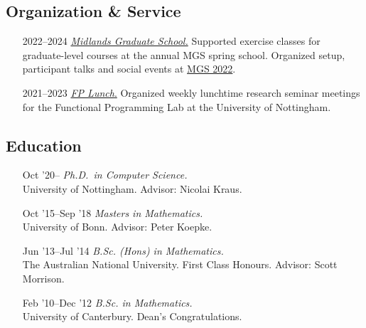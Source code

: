 \documentclass[12pt,a4paper]{article}
\begin{document}
\subsection{Organization \& Service}\label{organization-service}

\begin{itemize}[leftmargin=7ex]
\item[\small 2022--2024]
  \href{http://www.cs.nott.ac.uk/MGS}{\emph{Midlands Graduate School.}}
  Supported exercise classes for graduate-level courses at the annual MGS spring school.
  Organized setup, participant talks and social events at \href{https://www.cs.nott.ac.uk/~psznk/events/mgs22.html}{MGS 2022}.
\item[\small 2021--2023]
  \href{https://www.nottingham.ac.uk/research/groups/fp-lab/fp-lunch/fp-lunch.aspx}{\emph{FP Lunch}.}
  Organized weekly lunchtime research seminar meetings for the Functional Programming Lab at the University of Nottingham.
\end{itemize}

\subsection{Education}

\begin{itemize}[leftmargin=7ex]
\item[\small {\scriptsize Oct} '20--]
  \emph{Ph.D.~in Computer Science.}\\
  University of Nottingham.
  Advisor: Nicolai Kraus.

\item[\small {\scriptsize Oct} '15--{\scriptsize Sep} '18]
  \emph{Masters in Mathematics.}\\
  University of Bonn.
  Advisor: Peter Koepke.

\item[\small {\scriptsize Jun} '13--{\scriptsize Jul} '14]
  \emph{B.Sc. (Hons) in Mathematics.}\\
  The Australian National University.
  First Class Honours.
  Advisor: Scott Morrison.

\item[\small {\scriptsize Feb} '10--{\scriptsize Dec} '12]
  \emph{B.Sc. in Mathematics.}\\
  University of Canterbury.
  Dean's Congratulations.
\end{itemize}
\end{document}
